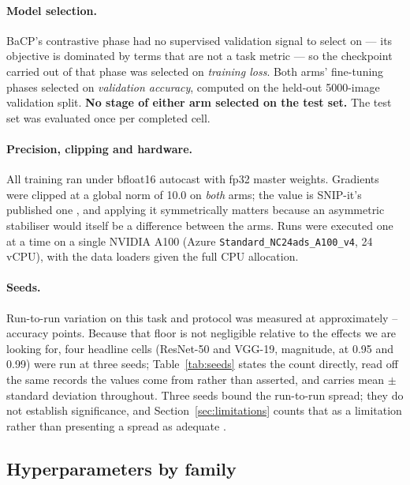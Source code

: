 \paragraph{Model selection.}
BaCP's contrastive phase had no supervised validation signal to select on --- its
objective is dominated by terms that are not a task metric --- so the checkpoint
carried out of that phase was selected on \emph{training loss}. Both arms'
fine-tuning phases selected on \emph{validation accuracy}, computed on the
held-out \num{5000}-image validation split. \textbf{No stage of either arm
selected on the test set.} The test set was evaluated once per completed cell.

\paragraph{Precision, clipping and hardware.}
All training ran under bfloat16 autocast with fp32 master weights. Gradients were
clipped at a global norm of 10.0 on \emph{both} arms; the value is SNIP-it's
published one \citep{verdenius2020snipit}, and applying it symmetrically matters
because an asymmetric stabiliser would itself be a difference between the arms.
Runs were executed one at a time on a single NVIDIA A100 (Azure
\texttt{Standard\_NC24ads\_A100\_v4}, 24 vCPU), with the data loaders given the
full CPU allocation.

\paragraph{Seeds.}
Run-to-run variation on this task and protocol was measured at approximately
-- accuracy points.
Because that floor is not negligible relative to the effects we are looking for,
four headline cells (ResNet-50 and VGG-19, magnitude, at 0.95 and 0.99) were
run at three seeds; Table~\ref{tab:seeds} states the count directly, read off
the same records the values come from rather than asserted, and carries mean
$\pm$ standard deviation throughout. Three seeds bound the run-to-run spread;
they do not establish significance, and Section~\ref{sec:limitations} counts
that as a limitation rather than presenting a spread as
adequate \citep{bouthillier2021variance}.

\subsection{Hyperparameters by family}

